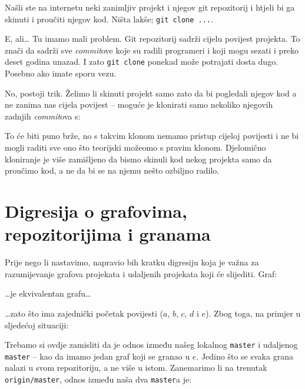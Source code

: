 Našli ste na internetu neki zanimljiv projekt i njegov git repozitorij i htjeli bi ga skinuti i proučiti njegov kod. 
Ništa lakše; \verb+git clone ...+.

E, ali\dots
Tu imamo mali problem.
Git repozitorij sadrži cijelu povijest projekta. 
To znači da sadrži sve \emph{commit}ove koje su radili programeri i koji mogu sezati i preko deset godina unazad.
I zato \verb+git clone+ ponekad može potrajati dosta dugo. 
Posebno ako imate sporu vezu.

No, postoji trik.
Želimo li skinuti projekt samo zato da bi pogledali njegov kod a ne zanima nas cijela povijest -- moguće je klonirati samo nekoliko njegovih zadnjih \emph{commit}ova s:


To će biti puno brže, no s takvim klonom nemamo pristup cijeloj povijesti i ne bi mogli raditi sve ono što teorijski možeomo s pravim klonom. 
Djelomično kloniranje je više zamišljeno da bismo skinuli kod nekog projekta samo da proučimo kod, a ne da bi se na njemu nešto ozbiljno radilo.

\section*{Digresija o grafovima, repozitorijima i granama}

Prije nego li nastavimo, napravio bih kratku digresiju koja je važna za razumijevanje grafova projekata i udaljenih projekata koji će slijediti.
Graf:



\dots{}je ekvivalentan grafu\dots



\dots{}zato što ima zajednički početak povijesti ($a$, $b$, $c$, $d$ i $e$).
Zbog toga, na primjer u sljedećoj situaciji:



Trebamo si ovdje zamisliti da je odnos između našeg lokalnog \verb+master+ i udaljenog \verb+master+ -- kao da imamo jedan graf koji se granao u $e$. Jedino što se svaka grana nalazi u svom repozitoriju, a ne više u istom.
Zanemarimo li na trenutak \verb+origin/master+, odnos između naša dva \verb+master+a je:



